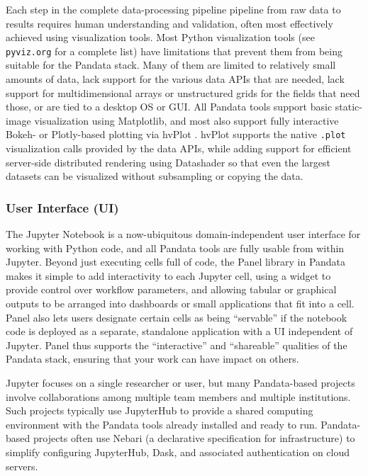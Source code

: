 Each step in the complete data-processing pipeline pipeline from raw data to results requires human understanding and validation, often most effectively achieved using visualization tools. Most Python visualization tools (see \texttt{pyviz.org} for a complete list) have limitations that prevent them from being suitable for the Pandata stack. Many of them are limited to relatively small amounts of data, lack support for the various data APIs that are needed, lack support for multidimensional arrays or unstructured grids for the fields that need those, or are tied to a desktop OS or GUI. All Pandata tools support basic static-image visualization using Matplotlib, and most also support fully interactive Bokeh- or Plotly-based plotting via hvPlot \cite{rudiger:hvplot}. hvPlot supports the native \texttt{.plot} visualization calls provided by the data APIs, while adding support for efficient server-side distributed rendering using Datashader so that even the largest datasets can be visualized without subsampling or copying the data.

\subsubsection{User Interface (UI)}

The Jupyter Notebook is a now-ubiquitous domain-independent user interface for working with Python code, and all Pandata tools are fully usable from within Jupyter. Beyond just executing cells full of code, the Panel library in Pandata makes it simple to add interactivity to each Jupyter cell, using a widget to provide control over workflow parameters, and allowing tabular or graphical outputs to be arranged into dashboards or small applications that fit into a cell. Panel also lets users designate certain cells as being ``servable'' if the notebook code is deployed as a separate, standalone application with a UI independent of Jupyter. Panel thus supports the ``interactive'' and ``shareable'' qualities of the Pandata stack, ensuring that your work can have impact on others.

Jupyter focuses on a single researcher or user, but many Pandata-based projects involve collaborations among multiple team members and multiple institutions. Such projects typically use JupyterHub to provide a shared computing environment with the Pandata tools already installed and ready to run. Pandata-based projects often use Nebari (a declarative specification for infrastructure) to simplify configuring JupyterHub, Dask, and associated authentication on cloud servers.

